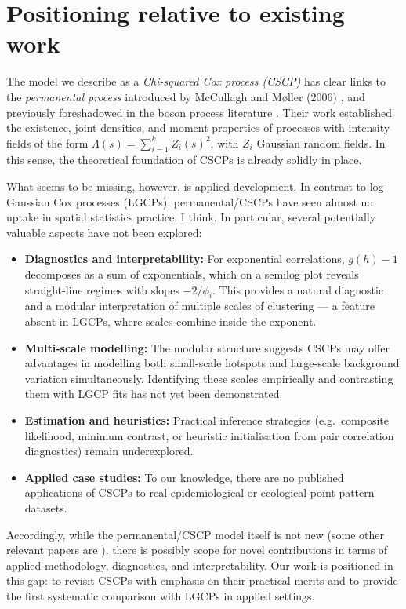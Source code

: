 \documentclass[11pt]{article}
\begin{document}
\section{Positioning relative to existing work}

The model we describe as a \emph{Chi-squared Cox process (CSCP)} has clear 
links to the \emph{permanental process} introduced by McCullagh and M{\o}ller (2006) \cite{McCullaghMoller2006}, 
and previously foreshadowed in the boson process literature 
\cite{ShiraiTakahashi2003}. 
Their work established the existence, joint densities, and moment properties of 
processes with intensity fields of the form 
$\Lambda(s)=\sum_{i=1}^k Z_i(s)^2$, 
with $Z_i$ Gaussian random fields. In this sense, the theoretical foundation of CSCPs 
is already solidly in place.

What seems to be missing, however, is applied development. 
In contrast to log-Gaussian Cox processes (LGCPs), 
permanental/CSCPs have seen almost no uptake in 
spatial statistics practice. I think.
In particular, several potentially valuable aspects have not been explored:
\begin{itemize}
	\item \textbf{Diagnostics and interpretability:} 
	For exponential correlations, $g(h)-1$ decomposes as a sum of exponentials, 
	which on a semilog plot reveals straight-line regimes with slopes $-2/\phi_i$. 
	This provides a natural diagnostic and a modular interpretation of multiple scales of clustering --- a feature absent in LGCPs, where scales combine inside the exponent.
	\item \textbf{Multi-scale modelling:} 
	The modular structure suggests CSCPs may offer advantages in modelling 
	both small-scale hotspots and large-scale background variation simultaneously. 
	Identifying these scales empirically and contrasting them with LGCP fits 
	has not yet been demonstrated.
	\item \textbf{Estimation and heuristics:} 
	Practical inference strategies (e.g.\ composite likelihood, minimum contrast, 
	or heuristic initialisation from pair correlation diagnostics) remain underexplored.
	\item \textbf{Applied case studies:} 
	To our knowledge, there are no published applications of CSCPs to real 
	epidemiological or ecological point pattern datasets. 
\end{itemize}

Accordingly, while the permanental/CSCP model itself is not new (some other relevant papers are \cite{WalderBishopICML2017,Nicolis2022,Eisenbaum2008}), 
there is possibly scope for novel contributions in terms of 
applied methodology, diagnostics, and interpretability. 
Our work is positioned in this gap: to revisit CSCPs with emphasis on their 
practical merits and to provide the first systematic comparison with LGCPs in applied settings.
\end{document}
